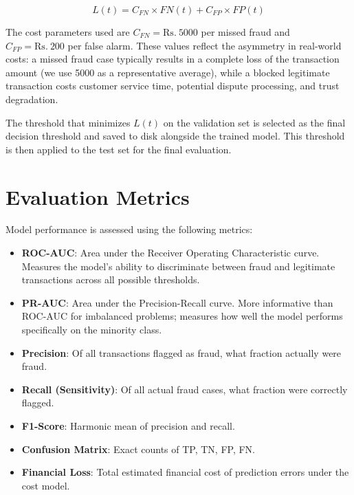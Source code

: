 \begin{equation}
L(t) = C_{FN} \times FN(t) + C_{FP} \times FP(t)
\end{equation}

The cost parameters used are $C_{FN} = \text{Rs.}\ 5000$ per missed fraud and $C_{FP} = \text{Rs.}\ 200$ per false alarm. These values reflect the asymmetry in real-world costs: a missed fraud case typically results in a complete loss of the transaction amount (we use 5000 as a representative average), while a blocked legitimate transaction costs customer service time, potential dispute processing, and trust degradation.

The threshold that minimizes $L(t)$ on the validation set is selected as the final decision threshold and saved to disk alongside the trained model. This threshold is then applied to the test set for the final evaluation.

\section{Evaluation Metrics}

Model performance is assessed using the following metrics:

\begin{itemize}
    \item \textbf{ROC-AUC}: Area under the Receiver Operating Characteristic curve. Measures the model's ability to discriminate between fraud and legitimate transactions across all possible thresholds.
    \item \textbf{PR-AUC}: Area under the Precision-Recall curve. More informative than ROC-AUC for imbalanced problems; measures how well the model performs specifically on the minority class.
    \item \textbf{Precision}: Of all transactions flagged as fraud, what fraction actually were fraud.
    \item \textbf{Recall (Sensitivity)}: Of all actual fraud cases, what fraction were correctly flagged.
    \item \textbf{F1-Score}: Harmonic mean of precision and recall.
    \item \textbf{Confusion Matrix}: Exact counts of TP, TN, FP, FN.
    \item \textbf{Financial Loss}: Total estimated financial cost of prediction errors under the cost model.
\end{itemize}

